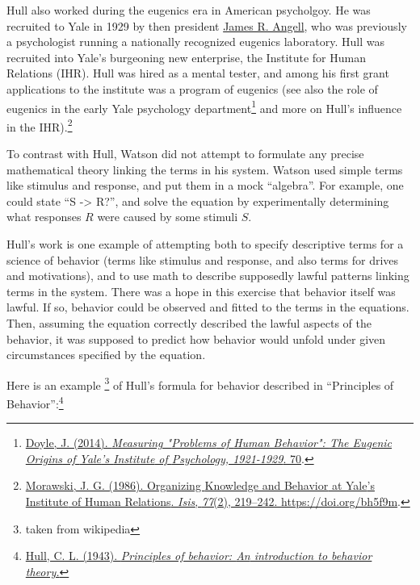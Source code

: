 \documentclass[
  oneside,
  12pt]{crumpbook}
\newenvironment{floatrightbox50}{%
  \wrapfigure{R}{.5\textwidth}%
  }{%
  \endwrapfigure}
\begin{document}
\begin{floatrightbox50}
Hull also worked during the eugenics era in American psycholgoy. He was recruited to Yale in 1929 by then president \href{https://en.wikipedia.org/wiki/James_Rowland_Angell}{James R. Angell}, who was previously a psychologist running a nationally recognized eugenics laboratory. Hull was recruited into Yale's burgeoning new enterprise, the Institute for Human Relations (IHR). Hull was hired as a mental tester, and among his first grant applications to the institute was a program of eugenics (see also the role of eugenics in the early Yale psychology department\footnote{\protect\hyperlink{ref-doyleMeasuringProblemsHuman2014}{Doyle, J. (2014). \emph{Measuring "{Problems} of {Human Behavior}": {The Eugenic Origins} of {Yale}'s {Institute} of {Psychology}, 1921-1929}. 70}.} and more on Hull's influence in the IHR).\footnote{\protect\hyperlink{ref-morawskiOrganizingKnowledgeBehavior1986}{Morawski, J. G. (1986). Organizing {Knowledge} and {Behavior} at {Yale}'s {Institute} of {Human Relations}. \emph{Isis}, \emph{77}(2), 219--242. \url{https://doi.org/bh5f9m}}.}

\end{floatrightbox50}

To contrast with Hull, Watson did not attempt to formulate any precise mathematical theory linking the terms in his system. Watson used simple terms like stimulus and response, and put them in a mock ``algebra''. For example, one could state ``S -\textgreater{} R?'', and solve the equation by experimentally determining what responses \(R\) were caused by some stimuli \(S\).

Hull's work is one example of attempting both to specify descriptive terms for a science of behavior (terms like stimulus and response, and also terms for drives and motivations), and to use math to describe supposedly lawful patterns linking terms in the system. There was a hope in this exercise that behavior itself was lawful. If so, behavior could be observed and fitted to the terms in the equations. Then, assuming the equation correctly described the lawful aspects of the behavior, it was supposed to predict how behavior would unfold under given circumstances specified by the equation.

Here is an example \footnote{taken from wikipedia} of Hull's formula for behavior described in ``Principles of Behavior'':\footnote{\protect\hyperlink{ref-hullPrinciplesBehaviorIntroduction1943}{Hull, C. L. (1943). \emph{Principles of behavior: {An} introduction to behavior theory.}}}
\end{document}
